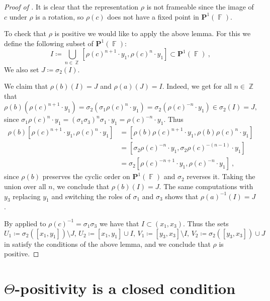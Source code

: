 \documentclass{amsart}
\theoremstyle{plain}
\theoremstyle{definition}
\DeclareMathOperator{\Fb}{{\mathbb{F}}}
\DeclareMathOperator{\Zb}{\mathbb{Z}}
\newcommand{\1}{\mathbf{1}}
\begin{document}
\begin{proof}[Proof of ]
It is clear that the representation $\rho$ is not frameable since the image of $c$ under $\rho$ is a rotation, so $\rho(c)$ does not have a fixed point in $\mathbf{P}^1(\Fb)$.

To check that $\rho$ is positive we would like to apply the above lemma.
For this we define the following subset of $\mathbf{P}^1(\Fb)$: 
\[I \coloneqq\bigcup_{n \in \Zb} [\rho(c)^{n+1} \cdot y_1, \rho(c)^{n} \cdot y_1] \subset \mathbf{P}^1(\Fb)~,\]
We also set $J\coloneqq \sigma_2(I)$.

We claim that $\rho(b)(I)=J$ and $\rho(a)(J)=I$.
Indeed, we get for all $n \in \Zb$ that 
\[\rho(b) (\rho(c)^{n+1} \cdot y_1) = \sigma_2 (\sigma_1 \rho(c)^n \cdot y_1) =\sigma_2 (\rho(c)^{-n} \cdot y_1) \in \sigma_2 (I)=J,\]
since $\sigma_1 \rho(c)^n \cdot y_1 = (\sigma_1\sigma_3)^n \sigma_1 \cdot y_1 = \rho(c)^{-n} \cdot y_1$.
Thus
\begin{align*}
    \rho(b)[\rho(c)^{n+1} \cdot y_1, \rho(c)^{n} \cdot y_1] &= [\rho(b) \rho(c)^{n+1} \cdot y_1, \rho(b) \rho(c)^{n} \cdot y_1]\\
    &= [\sigma_2 \rho(c)^{-n} \cdot y_1, \sigma_2 \rho(c)^{-(n-1)} \cdot y_1]\\
    &= \sigma_2 [\rho(c)^{-n+1} \cdot y_1,\rho(c)^{-n} \cdot y_1]~,
\end{align*}
since $\rho(b)$ preserves the cyclic order on $\mathbf{P}^1(\Fb)$ and $\sigma_2$ reverses it.
Taking the union over all $n$, we conclude that $\rho(b)(I) = J$.
The same computations with $y_3$ replacing $y_1$ and switching the roles of $\sigma_1$ and $\sigma_3$ shows that $\rho(a)^{-1}(I) = J$.

By  applied to $\rho(c)^{-1}=\sigma_1\sigma_3$ we have that $I \subset (x_1,x_3)$.
Thus the sets 
\[ U_1 \coloneqq \sigma_2([x_1,y_1]) \setminus J, \, U_2 \coloneqq [x_1,y_1]\cup I,\, V_1\coloneqq [y_3,x_3] \setminus I, \, V_2 \coloneqq \sigma_2([y_3,x_3]) \cup J \]
in  satisfy the conditions of the above lemma, and we conclude that $\rho$ is positive.
\end{proof}


\section{%
\texorpdfstring{%
$\Theta$-positivity is a closed condition}%
{Theta-positivity is a closed condition}}
\label{section:PositivityClosed}
\end{document}
